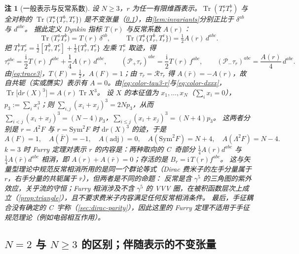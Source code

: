 \documentclass[UTF8,a4paper,11pt,fontset=fandol]{ctexart}
\theoremstyle{cplain}
\theoremstyle{cdefinition}
\theoremstyle{cremark}
\newtheorem{remark}[theorem]{注}
\numberwithin{equation}{section}
\DeclareMathOperator{\Tr}{Tr}
\newcommand{\dd}{\mathrm{d}}                         %
\newcommand{\Rop}{\mathcal{R}}                       %
\newcommand{\Pp}{\mathcal{P}_{+}}                    %
\newcommand{\Pm}{\mathcal{P}_{-}}                    %
\newcommand{\ii}{\mathrm{i}}                        %
\begin{document}
\begin{remark}[一般表示与反常系数]\label{rem:color-anomaly}
设 $N\ge3$，$r$ 为任一有限维酉表示。$\Tr(T_r^aT_r^b)$ 与全对称的 $\Tr\bigl(T_r^a\{T_r^b,T_r^c\}\bigr)$ 是不变张量（\cref{sec:color-invariants}），由\cref{lem:invariants}分别正比于 $\delta^{ab}$ 与 $d^{abc}$。
据此定义 Dynkin 指标 $T(r)$ 与反常系数 $A(r)$：
\begin{equation}\label{eq:color-anomaly-def}
\Tr\bigl(T_r^aT_r^b\bigr)=T(r)\,\delta^{ab},\qquad\Tr\bigl(T_r^a\{T_r^b,T_r^c\}\bigr)=\tfrac12A(r)\,d^{abc}.
\end{equation}
把 $T_r^bT_r^c=\frac12[T_r^b,T_r^c]+\frac12\{T_r^b,T_r^c\}$ 左乘 $T_r^a$ 取迹，得
\begin{equation}\label{eq:color-tau3-r}
\tau_r^{abc}=\frac{\ii}{2}T(r)\,f^{abc}+\frac14A(r)\,d^{abc},\qquad(\Pp\tau_r)^{abc}=\frac{\ii}{2}T(r)\,f^{abc},\qquad(\Pm\tau_r)^{abc}=\frac{A(r)}4\,d^{abc}.
\end{equation}
由\cref{eq:trace3}，$T(F)=\frac12$，$A(F)=1$；由 $\tau_{\bar r}=\Rop\tau_r$ 得 $A(\bar r)=-A(r)$，故自共轭（实或赝实）表示有 $A=0$。由\cref{eq:color-tau3-r}与\cref{eq:color-dxxx}，$\Tr\bigl[\dd r(X)^3\bigr]=A(r)\Tr X^3$。
设 $X$ 的本征值为 $x_1,\dots,x_N$（$\sum_ix_i=0$），$p_3:=\sum_ix_i^3$；则 $\sum_{i,j}(x_i+x_j)^3=2Np_3$，从而 $\sum_{i<j}(x_i+x_j)^3=(N-4)p_3$，$\sum_{i\le j}(x_i+x_j)^3=(N+4)p_3$。
这两者分别是 $r=\Lambda^2F$ 与 $r=\mathrm{Sym}^2F$ 时 $\dd r(X)^3$ 的迹，于是
\begin{equation}\label{eq:color-A-values}
A(F)=1,\quad A(\bar F)=-1,\quad A(\mathrm{adj})=0,\quad A(\mathrm{Sym}^2F)=N+4,\quad A(\Lambda^2F)=N-4 .
\end{equation}
$k=3$ 时 Furry 定理对表示 $r$ 的内容是：两种取向的 C~奇部分 $\frac14A(r)d^{abc}$ 与 $\frac14A(\bar r)d^{abc}$ 相消，即 $A(r)+A(\bar r)=0$；存活的是 $B_r=\ii\,T(r)f^{abc}$。
这与矢量型理论中规范反常相消所用的是同一个群论等式（Dirac 费米子的左手分量属于 $r$，右手分量的共轭属于 $\bar r$），但两者是不同的命题：
反常是含 $\gamma^5$ 的三角图的紫外效应，关乎流的守恒；Furry 相消涉及不含 $\gamma^5$ 的 VVV 圈，在被积函数层次上成立（\cref{prop:triangle}），且不要求费米子内容满足任何反常相消条件。
最后，手征耦合没有确定的 C~宇称（\cref{sec:dirac-parity}），因此这里的 Furry 定理不适用于手征规范理论（例如电弱相互作用）。
\end{remark}

\subsection{\texorpdfstring{$N=2$ 与 $N\ge3$}{N=2 与 N≥3} 的区别；伴随表示的不变张量}\label{sec:color-invariants}
\end{document}
